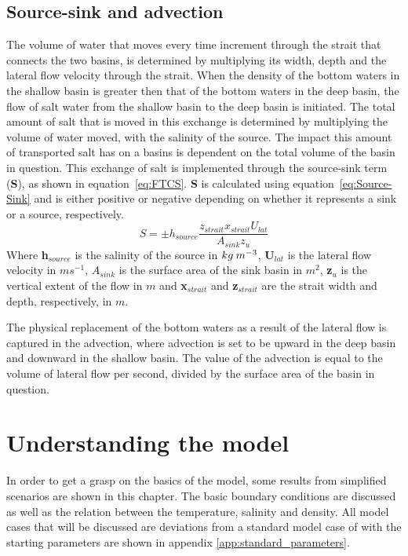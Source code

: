 \documentclass[twocolumn]{article}
\begin{document}
\subsection{Source-sink and advection}
The volume of water that moves every time increment through the strait that connects the two basins, is determined by multiplying its width, depth and the lateral flow velocity through the strait. When the density of the bottom waters in the shallow basin is greater then that of the bottom waters in the deep basin, the flow of salt water from the shallow basin to the deep basin is initiated. The total amount of salt that is moved in this exchange is determined by multiplying the volume of water moved, with the salinity of the source. The impact this amount of transported salt has on a basins is dependent on the total volume of the basin in question. This exchange of salt is implemented through the source-sink term (\textbf{S}), as shown in equation~\ref{eq:FTCS}. \textbf{S} is calculated using equation~\ref{eq:Source-Sink} and is either positive or negative depending on whether it represents a sink or a source, respectively.
\begin{equation}
    S = \pm h_{source} \frac{ z_{strait} x_{strait} U_{lat} }{A_{sink} z_u} 
    \label{eq:Source-Sink}
\end{equation}
Where \textbf{h}$_{source}$ is the salinity of the source in $kg \hspace{0.8mm} m^{-3}$, \textbf{U}$_{lat}$ is the lateral flow velocity in $ms^{-1}$, $A_{sink}$ is the surface area of the sink basin in $m^2$, \textbf{z}$_u$ is the vertical extent of the flow in $m$ and \textbf{x}$_{strait}$ and \textbf{z}$_{strait}$ are the strait width and depth, respectively, in $m$.

The physical replacement of the bottom waters as a result of the lateral flow is captured in the advection, where advection is set to be upward in the deep basin and downward in the shallow basin. The value of the advection is equal to the volume of lateral flow per second, divided by the surface area of the basin in question. 



\section{Understanding the model}
In order to get a grasp on the basics of the model, some results from simplified scenarios are shown in this chapter. The basic boundary conditions are discussed as well as the relation between the temperature, salinity and density. All model cases that will be discussed are deviations from a standard model case of with the starting parameters are shown in appendix \ref{app:standard_parameters}.
\end{document}
